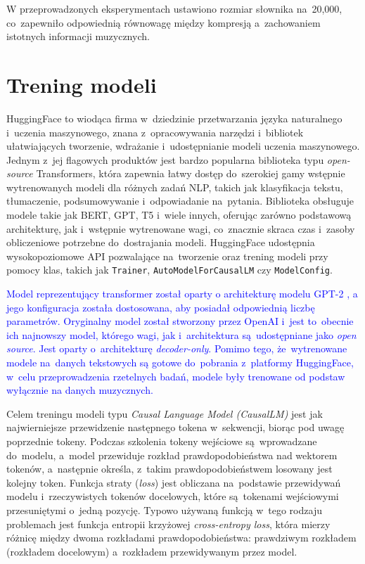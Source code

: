 \documentclass[data-science]{agh-wi} %
\begin{document}
W przeprowadzonych eksperymentach ustawiono rozmiar słownika na~20,000, co~zapewniło odpowiednią równowagę między kompresją a~zachowaniem istotnych informacji muzycznych.

\section{Trening modeli}
HuggingFace to wiodąca firma w~dziedzinie przetwarzania języka naturalnego i~uczenia maszynowego, znana z~opracowywania narzędzi i~bibliotek ułatwiających tworzenie, wdrażanie i~udostępnianie modeli uczenia maszynowego. Jednym z~jej flagowych produktów jest bardzo popularna biblioteka typu \textit{open-source} Transformers, która zapewnia łatwy dostęp do~szerokiej gamy wstępnie wytrenowanych modeli dla różnych zadań NLP, takich jak klasyfikacja tekstu, tłumaczenie, podsumowywanie i~odpowiadanie na~pytania. Biblioteka obsługuje modele takie jak BERT, GPT, T5 i~wiele innych, oferując zarówno podstawową architekturę, jak i~wstępnie wytrenowane wagi, co~znacznie skraca czas i~zasoby obliczeniowe potrzebne do~dostrajania modeli. HuggingFace udostępnia wysokopoziomowe API pozwalające na~tworzenie oraz trening modeli przy pomocy klas, takich jak \texttt{Trainer}, \texttt{AutoModelForCausalLM} czy \texttt{ModelConfig}.

\textcolor{blue}{Model reprezentujący transformer został oparty o architekturę modelu GPT-2 \cite*{gpt2}, a jego konfiguracja została dostosowana, aby posiadał odpowiednią liczbę parametrów. Oryginalny model został stworzony przez OpenAI i~jest to~obecnie ich najnowszy model, którego wagi, jak i~architektura są~udostępniane jako \textit{open source}. Jest oparty o~architekturę \textit{decoder-only}. Pomimo tego, że~wytrenowane modele na~danych tekstowych są gotowe do~pobrania z~platformy HuggingFace, w~celu przeprowadzenia rzetelnych badań, modele były trenowane od podstaw wyłącznie na danych muzycznych.}

Celem treningu modeli typu \textit{Causal Language Model (CausalLM)} jest jak najwierniejsze przewidzenie następnego tokena w~sekwencji, biorąc pod uwagę poprzednie tokeny. Podczas szkolenia tokeny wejściowe są~wprowadzane do~modelu, a~model przewiduje rozkład prawdopodobieństwa nad wektorem tokenów, a~następnie określa, z~takim prawdopodobieństwem losowany jest kolejny token. Funkcja straty (\textit{loss}) jest obliczana na~podstawie przewidywań modelu i~rzeczywistych tokenów docelowych, które są~tokenami wejściowymi przesuniętymi o~jedną pozycję. Typowo używaną funkcją w~tego rodzaju problemach jest funkcja entropii krzyżowej \textit{cross-entropy loss}, która mierzy różnicę między dwoma rozkładami prawdopodobieństwa: prawdziwym rozkładem (rozkładem docelowym) a~rozkładem przewidywanym przez model.
\end{document}
